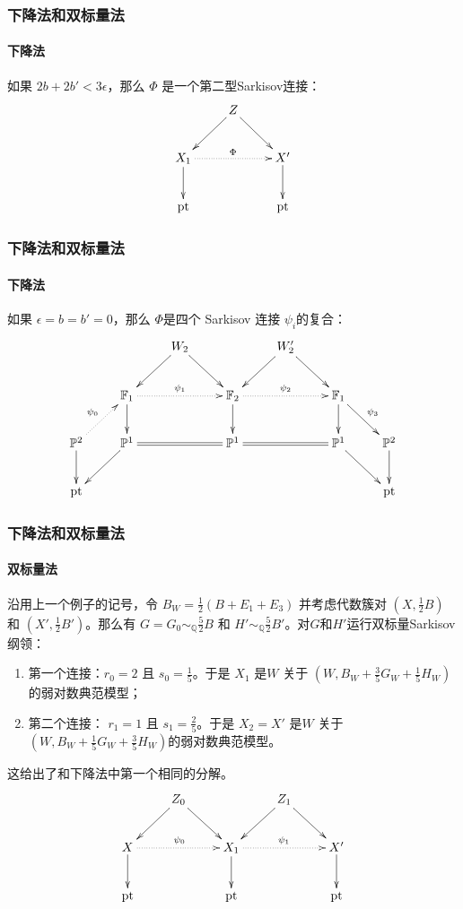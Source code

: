 \documentclass[10pt]{ctexbeamer}
\begin{document}
\begin{frame}[shrink]
  \frametitle{下降法和双标量法}
  \framesubtitle{下降法}
  如果 $ 2b+2b'< 3\epsilon $，那么 $\Phi$ 是一个第二型Sarkisov连接：
        \[ \xymatrix{
            &Z\ar[rd]\ar[ld] & \\
            X_{1}\ar@{.>}[rr]^{\Phi}\ar[d]& &X'\ar[d]\\
            \text{pt}&&\text{pt} } \]
\end{frame}
\begin{frame}[shrink]
  \frametitle{下降法和双标量法}
  \framesubtitle{下降法}
  如果 $ \epsilon=b=b'=0 $，那么 $\Phi$是四个 Sarkisov 连接 $\psi_{i}$的复合：
        \[ \xymatrix{
          &&W_2\ar[ld]\ar[rd]&&W_2'\ar[ld]\ar[rd]\\
          &\mathbb{F}_{1}\ar@{.>}[rr]^{\psi_{1}}\ar[d]&&\mathbb{F}_2\ar@{.>}[rr]^{\psi_{2}}\ar[d]&&\mathbb{F}_1\ar[d]\ar[rd]^{\psi_{3}}\\
          \mathbb{P}^{2}\ar[d]\ar@{.>}[ru]^{\psi_{0}}&\mathbb{P}^1\ar[ld]\ar@{=}[rr]&&\mathbb{P}^1\ar@{=}[rr]&&\mathbb{P}^1\ar[rd]&\mathbb{P}^2\ar[d]\\
          \text{pt}&&&&&&\text{pt} } \]
\end{frame}

\begin{frame}[shrink]
  \frametitle{下降法和双标量法}
  \framesubtitle{双标量法}
沿用上一个例子的记号，令 $B_{W}=\frac{1}{2}(B+E_{1}+E_{3})$ 并考虑代数簇对 $(X,\frac{1}{2}B)$ 和 $(X',\frac{1}{2}B')$。那么有 $G=G_{0}\sim_{\mathbb{Q}}\frac{5}{2}B$ 和 $H'\sim_{\mathbb{Q}}\frac{5}{2}B'$。对$G$和$H'$运行双标量Sarkisov纲领：
\begin{enumerate}
  \pause
  \item 第一个连接：$r_{0}=2$ 且 $s_{0}=\frac{1}{5}$。于是 $X_{1}$ 是$W$  关于 $(W,B_{W}+\frac{3}{5}G_{W}+\frac{1}{5}H_{W})$的弱对数典范模型；
  \pause
  \item 第二个连接： $r_{1}=1$ 且 $s_{1}=\frac{2}{5}$。于是 $X_{2}= X'$ 是$W$ 关于  $(W,B_{W}+\frac{1}{5}G_{W}+\frac{3}{5}H_{W})$的弱对数典范模型。
\end{enumerate}
  \pause
  这给出了和下降法中第一个相同的分解。
    \[ \xymatrix{
        &Z_{0}\ar[rd]\ar[ld] & &Z_{1}\ar[rd]\ar[ld]\\
        X\ar[d]\ar@{.>}[rr]^{\psi_{0}}& &X_{1}\ar@{.>}[rr]^{\psi_{1}}\ar[d]&&X'\ar[d]\\
        \text{pt}&&\text{pt}&&\text{pt} } \]
\end{frame}
\end{document}
